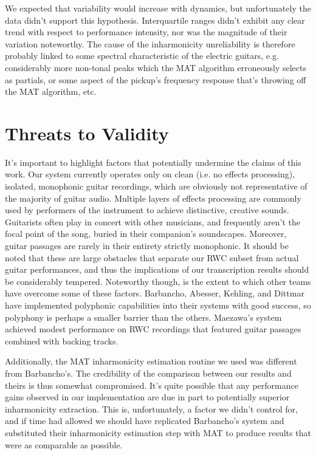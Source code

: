 \documentclass[12pt]{cmuthesis}
\begin{document}
We expected that variability would increase with dynamics, but unfortunately the data didn't support this hypothesis. Interquartile ranges didn't exhibit any clear trend with respect to performance intensity, nor was the magnitude of their variation noteworthy. The cause of the inharmonicity unreliability is therefore probably linked to some spectral characteristic of the electric guitars, e.g. considerably more non-tonal peaks which the MAT algorithm erroneously selects as partials, or some aspect of the pickup's frequency response that's throwing off the MAT algorithm, etc.





\section{Threats to Validity}
It's important to highlight factors that potentially undermine the claims of this work. Our system currently operates only on clean (i.e. no effects processing), isolated, monophonic guitar recordings, which are obviously not representative of the majority of guitar audio. Multiple layers of effects processing are commonly used by performers of the instrument to achieve distinctive, creative sounds. Guitarists often play in concert with other musicians, and frequently aren't the focal point of the song, buried in their companion's soundscapes. Moreover, guitar passages are rarely in their entirety strictly monophonic. It should be noted that these are large obstacles that separate our RWC subset from actual guitar performances, and thus the implications of our transcription results should be considerably tempered. Noteworthy though, is the extent to which other teams have overcome some of these factors. Barbancho, Abesser, Kehling, and Dittmar have implemented polyphonic capabilities into their systems with good success, so polyphony is perhaps a smaller barrier than the others. Maezawa's system achieved modest performance on RWC recordings that featured guitar passages combined with backing tracks.

Additionally, the MAT inharmonicity estimation routine we used was different from Barbancho's. The credibility of the comparison between our results and theirs is thus somewhat compromised. It's quite possible that any performance gains observed in our implementation are due in part to potentially superior inharmonicity extraction. This is, unfortunately, a factor we didn't control for, and if time had allowed we should have replicated Barbancho's system and substituted their inharmonicity estimation step with MAT to produce results that were as comparable as possible.
\end{document}
